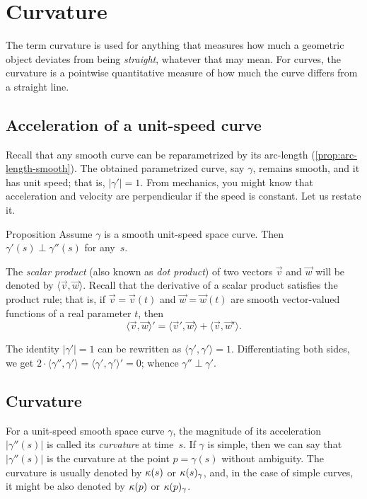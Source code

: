 \chapter{Curvature}
\label{chap:curve-curvature}

The term curvature is used for anything that measures how much a geometric object deviates from being \textit{straight}, whatever that may mean.
For curves, the curvature is a pointwise quantitative measure of how much the curve differs from a straight line.

\section{Acceleration of a unit-speed curve}

Recall that any smooth curve can be reparametrized by its arc-length (\ref{prop:arc-length-smooth}).
The obtained parametrized curve, say $\gamma$, remains smooth, and it has unit speed;
that is, $|\gamma'|=1$.
From mechanics, you might know that acceleration and velocity are perpendicular if the speed is constant.
Let us restate it.

\begin{thm}{Proposition}\label{prop:a'-pertp-a''}
Assume $\gamma$ is a smooth unit-speed space curve.
Then $\gamma'(s)\perp \gamma''(s)$ for any~$s$.
\end{thm}

The \emph{scalar product} (also known as \textit{dot product}) of two vectors $\vec v$ and $\vec w$ will be denoted by $\langle \vec v,\vec w\rangle$.
Recall that the derivative of a scalar product satisfies the product rule;
that is, if $\vec v=\vec v(t)$ and $\vec w=\vec w(t)$ are smooth vector-valued functions of a real parameter $t$, then
\[\langle \vec v,\vec w\rangle'=\langle \vec v',\vec w\rangle+\langle \vec v,\vec w'\rangle.\]

The identity $|\gamma'|=1$ can be rewritten as $\langle\gamma',\gamma'\rangle=1$.
Differentiating both sides, we get
$2\cdot\langle\gamma'',\gamma'\rangle=\langle\gamma',\gamma'\rangle'=0$;
whence $\gamma''\perp\gamma'$.
\qeds

\section{Curvature}\label{sec:curvature}

For a unit-speed smooth space curve $\gamma$, the magnitude of its acceleration $|\gamma''(s)|$ is called its \emph{curvature} at  time~$s$.
If $\gamma$ is simple, then we can say that $|\gamma''(s)|$ is the curvature at the point $p=\gamma(s)$ without ambiguity.
The curvature is usually denoted by $\kappa(s)$ or $\kappa(s)_\gamma$, and, in the case of simple curves, it might be also denoted by $\kappa(p)$ or $\kappa(p)_\gamma$.

